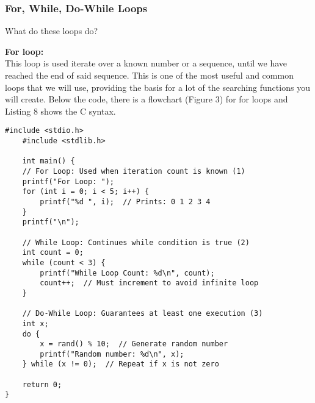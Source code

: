 \documentclass[a4paper,12pt]{article}
\begin{document}
\subsubsection{For, While, Do-While Loops}

What do these loops do?

\textbf{For loop:}\\
This loop is used iterate over a known number or a sequence, until we have reached the end of said sequence. This is one of the most useful and common loops that we will use, providing the basis for a lot of the searching functions you will create. Below the code, there is a flowchart (Figure 3) for for loops and Listing 8 shows the C syntax.

\lstset{language=C}
\begin{lstlisting}[caption=For loop example]
    #include <stdio.h>
    #include <stdlib.h>
    
    int main() {
    // For Loop: Used when iteration count is known (1)
    printf("For Loop: ");
    for (int i = 0; i < 5; i++) {
        printf("%d ", i);  // Prints: 0 1 2 3 4
    }
    printf("\n");
    
    // While Loop: Continues while condition is true (2)
    int count = 0;
    while (count < 3) {
        printf("While Loop Count: %d\n", count);
        count++;  // Must increment to avoid infinite loop
    }
    
    // Do-While Loop: Guarantees at least one execution (3)
    int x;
    do {
        x = rand() % 10;  // Generate random number
        printf("Random number: %d\n", x);
    } while (x != 0);  // Repeat if x is not zero
    
    return 0;
}\end{lstlisting}

\hrulefill



\end{document}
